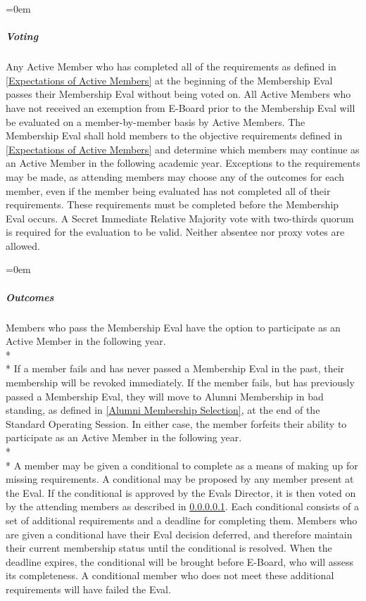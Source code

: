 \documentclass{article}
\newcommand{\asubsubsubsection}[1]{\parindent=0em\subparagraph{#1} \label{#1}}
\begin{document}
\asubsubsubsection{Voting}
Any Active Member who has completed all of the requirements as defined in \ref{Expectations of Active Members} at the beginning of the Membership Eval passes their Membership Eval without being voted on.
All Active Members who have not received an exemption from E-Board prior to the Membership Eval will be evaluated on a member-by-member basis by Active Members.
The Membership Eval shall hold members to the objective requirements defined in \ref{Expectations of Active Members} and determine which members may continue as an Active Member in the following academic year.
Exceptions to the requirements may be made, as attending members may choose any of the outcomes for each member, even if the member being evaluated has not completed all of their requirements.
These requirements must be completed before the Membership Eval occurs.
A Secret Immediate Relative Majority vote with two-thirds quorum is required for the evaluation to be valid.
Neither absentee nor proxy votes are allowed.

\asubsubsubsection{Outcomes}
Members who pass the Membership Eval have the option to participate as an Active Member in the following year.
\\* \\*
If a member fails and has never passed a Membership Eval in the past, their membership will be revoked immediately.
If the member fails, but has previously passed a Membership Eval, they will move to Alumni Membership in bad standing, as defined in \ref{Alumni Membership Selection}, at the end of the Standard Operating Session.
In either case, the member forfeits their ability to participate as an Active Member in the following year.
\\* \\*
A member may be given a conditional to complete as a means of making up for missing requirements.
A conditional may be proposed by any member present at the Eval.
If the conditional is approved by the Evals Director, it is then voted on by the attending members as described in \ref{Voting}.
Each conditional consists of a set of additional requirements and a deadline for completing them.
Members who are given a conditional have their Eval decision deferred, and therefore maintain their current membership status until the conditional is resolved.
When the deadline expires, the conditional will be brought before E-Board, who will assess its completeness.
A conditional member who does not meet these additional requirements will have failed the Eval.
\end{document}
